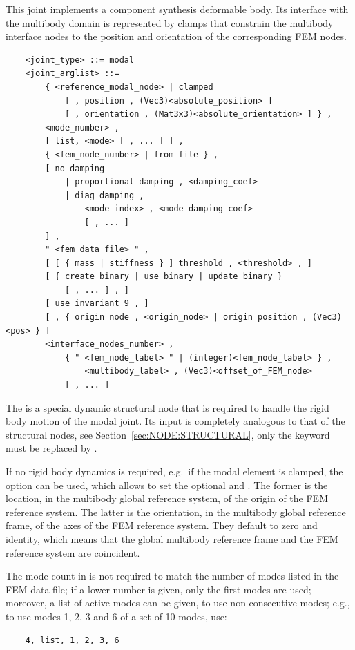 This joint implements a component synthesis deformable body.
Its interface with the multibody domain is represented by clamps
that constrain the multibody interface nodes to the position
and orientation of the corresponding FEM nodes.

\begin{verbatim}
    <joint_type> ::= modal
    <joint_arglist> ::=
        { <reference_modal_node> | clamped
            [ , position , (Vec3)<absolute_position> ]
            [ , orientation , (Mat3x3)<absolute_orientation> ] } ,
        <mode_number> ,
        [ list, <mode> [ , ... ] ] ,
        { <fem_node_number> | from file } ,
        [ no damping 
            | proportional damping , <damping_coef>
            | diag damping , 
                <mode_index> , <mode_damping_coef> 
                [ , ... ] 
        ] ,
        " <fem_data_file> " ,
        [ [ { mass | stiffness } ] threshold , <threshold> , ]
        [ { create binary | use binary | update binary }
            [ , ... ] , ]
        [ use invariant 9 , ]
        [ , { origin node , <origin_node> | origin position , (Vec3)<pos> } ]
        <interface_nodes_number> ,
            { " <fem_node_label> " | (integer)<fem_node_label> } ,
                <multibody_label> , (Vec3)<offset_of_FEM_node>
            [ , ... ]
\end{verbatim}
The  is a special dynamic structural node 
that is required to handle the rigid body motion of the modal joint.
Its input is completely analogous to that of the  structural
nodes, see Section~\ref{sec:NODE:STRUCTURAL}, only the keyword  
must be replaced by .

\noindent
If no rigid body dynamics is required, e.g.\ if the modal element
is clamped, the  option can be used, which allows
to set the optional 
and .
The former is the location, in the multibody
global reference system, of the origin of the FEM reference system.
The latter is the orientation,
in the multibody global reference frame,
of the axes of the FEM reference system.
They default to zero and identity, which means
that the global multibody reference frame
and the FEM reference system are coincident.

\noindent
The mode count in  is not required to match
the number of modes listed in the FEM data file; if a lower number
is given, only the first  modes are used;
moreover, a list of active modes can be given, to use non-consecutive
modes; e.g., to use modes 1, 2, 3 and 6 of a set of 10 modes, use:
\begin{verbatim}
	4, list, 1, 2, 3, 6
\end{verbatim}

